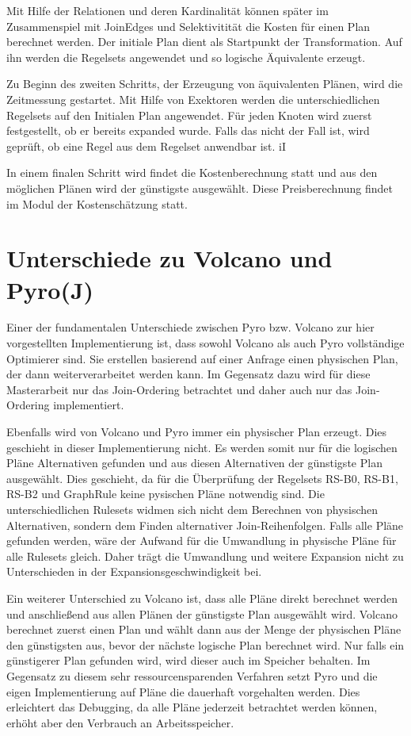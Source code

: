 Mit Hilfe der Relationen und deren Kardinalität können später im Zusammenspiel mit JoinEdges und Selektivitität die Kosten für einen Plan berechnet werden. Der initiale Plan dient als Startpunkt der Transformation. Auf ihn werden die Regelsets angewendet und so logische  Äquivalente erzeugt.

Zu Beginn des zweiten Schritts, der Erzeugung von äquivalenten Plänen, wird die Zeitmessung gestartet.  Mit Hilfe von Exektoren werden die unterschiedlichen Regelsets auf den Initialen Plan angewendet. Für jeden Knoten wird zuerst festgestellt, ob er bereits expanded wurde. Falls das nicht der Fall ist, wird geprüft, ob eine Regel aus dem Regelset anwendbar ist. iI

In einem finalen Schritt wird findet die Kostenberechnung statt und aus den möglichen Plänen wird der günstigste ausgewählt. Diese Preisberechnung findet im Modul der Kostenschätzung statt.


\section{Unterschiede zu Volcano und Pyro(J)}

Einer der fundamentalen Unterschiede zwischen Pyro bzw. Volcano zur hier vorgestellten Implementierung ist, dass sowohl Volcano als auch Pyro vollständige Optimierer sind. Sie erstellen basierend auf einer Anfrage einen physischen Plan, der dann weiterverarbeitet werden kann. Im Gegensatz dazu wird für diese Masterarbeit nur das Join-Ordering betrachtet und daher auch nur das Join-Ordering implementiert.


Ebenfalls wird von Volcano und Pyro immer ein physischer Plan erzeugt. Dies geschieht in dieser Implementierung nicht. Es werden somit nur für die logischen Pläne Alternativen gefunden und aus diesen Alternativen der günstigste Plan ausgewählt. Dies geschieht, da für die Überprüfung der Regelsets RS-B0, RS-B1, RS-B2 und GraphRule keine pysischen Pläne notwendig sind. Die unterschiedlichen Rulesets widmen sich nicht dem Berechnen von physischen Alternativen, sondern dem Finden alternativer Join-Reihenfolgen. Falls alle Pläne gefunden werden, wäre der Aufwand für die Umwandlung in physische Pläne für alle Rulesets gleich. Daher trägt die Umwandlung und weitere Expansion nicht zu Unterschieden in der Expansionsgeschwindigkeit bei.

Ein weiterer Unterschied zu Volcano ist, dass alle Pläne direkt berechnet werden und  anschließend aus allen Plänen der günstigste Plan ausgewählt wird. Volcano berechnet zuerst einen Plan und wählt dann aus der Menge der physischen Pläne den günstigsten aus, bevor der nächste logische Plan berechnet wird. Nur falls ein günstigerer Plan gefunden wird, wird dieser auch im Speicher behalten. Im Gegensatz zu diesem sehr ressourcensparenden Verfahren setzt Pyro und die eigen Implementierung auf Pläne die dauerhaft vorgehalten werden. Dies erleichtert das Debugging, da alle Pläne jederzeit betrachtet werden können, erhöht aber den Verbrauch an Arbeitsspeicher.

